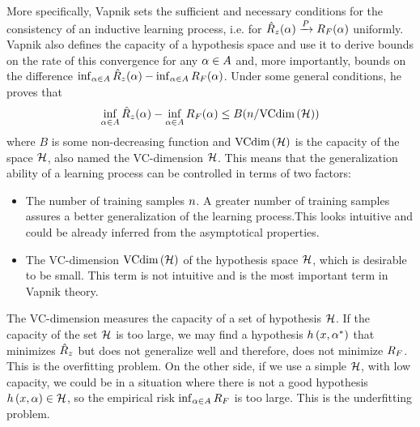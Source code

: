 More specifically, Vapnik sets the sufficient and necessary conditions for the consistency of an inductive learning process, i.e. for $\hat{R}_z(\alpha) \xrightarrow{P} R_F(\alpha) $ uniformly. Vapnik also defines the capacity of a hypothesis space and use it to derive bounds on the rate of this convergence for any $\alpha \in A$ and, more importantly, bounds on the difference $\inf_{\alpha \in A} \hat{R}_z(\alpha) - \inf_{\alpha \in A} R_F(\alpha)$.
Under some general conditions, he proves that
\begin{equation}\label{eq:ordinary_generalization_bound}
    \inf_{\param \in \paramspace} \emprisk(\param) - \inf_{\param \in \paramspace} \exprisk(\param) \leq B(\nsamples/\vcdim{\hypspace})
\end{equation}
where $B$ is some non-decreasing function and $\text{VCdim}\left(\mathcal{H}\right)$ is the capacity of the space $\mathcal{H}$, also named the VC-dimension $\mathcal{H}$. This means that the generalization ability of a learning process can be controlled in terms of two factors:
\begin{itemize}
    \item The number of training samples $n$. A greater number of training samples assures a better generalization of the learning process.This looks intuitive and could be already inferred from the asymptotical properties. 
    \item The VC-dimension $\text{VCdim}\left(\mathcal{H}\right)$ of the hypothesis space $\mathcal{H}$, which is desirable to be small. This term is not intuitive and is the most important term in Vapnik theory.
\end{itemize}
The VC-dimension measures the capacity of a set of hypothesis $\mathcal{H}$. 
If the capacity of the set $\mathcal{H}$ is too large, we may find a
hypothesis $h\left(x, {\alpha}^*\right)$ that minimizes $\hat{R}_z$ but does not 
generalize well and therefore, does not minimize $R_F$. This is the 
overfitting problem. 
On the other side, if we use a simple $\mathcal{H}$, 
with low capacity, we could be in a situation where there is not a good hypothesis $h\left(x, \alpha\right) \in \mathcal{H}$, so the empirical risk $\inf_{\alpha \in A} R_F$ is too large. This is the underfitting problem.


